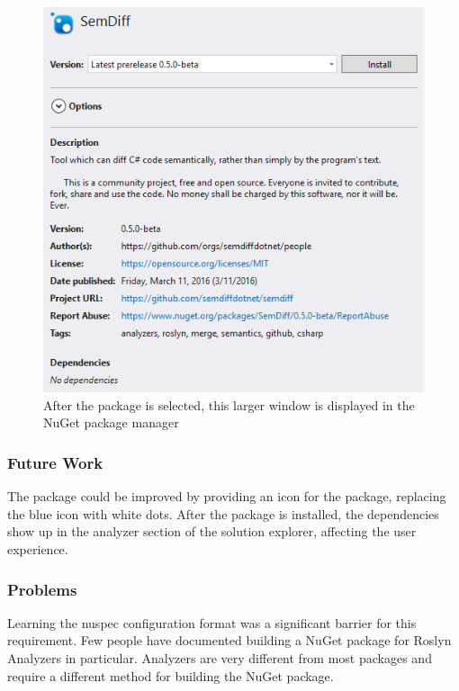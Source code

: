 \documentclass[draftclsnofoot,onecolumn]{IEEEtran}
\begin{document}
\begin{figure}[!t]
\centering
\includegraphics[scale=1]{SemDiffInPackageManager}
\caption{After the package is selected, this larger window is displayed in the 
NuGet package manager}
\label{pacman}
\end{figure}

\subsubsection{Future Work}

The package could be improved by providing an icon for the package, replacing 
the blue icon with white dots. After the package is installed, the 
dependencies show up in the analyzer section of the solution explorer, 
affecting the user experience.

\subsubsection{Problems}

Learning the nuspec configuration format was a significant barrier for this 
requirement. Few people have documented building a NuGet package for Roslyn 
Analyzers in particular. Analyzers are very different from most packages and 
require a different method for building the NuGet package. 
\end{document}
